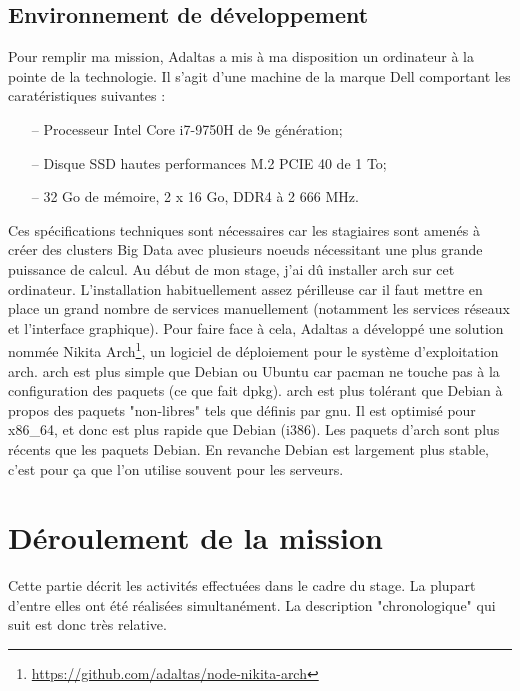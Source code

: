 \documentclass[12pt, french]{report}
\begin{document}
\section{Environnement de développement}

Pour remplir ma mission, Adaltas a mis à ma disposition un ordinateur à la pointe de la technologie. Il s'agit d'une machine de la marque Dell comportant les caratéristiques suivantes :

\begin{itemize}
  \item[--] Processeur Intel Core i7-9750H de 9e génération;
  \item[--] Disque SSD hautes performances M.2 PCIE 40 de 1 To;
  \item[--] 32 Go de mémoire, 2 x 16 Go, DDR4 à 2 666 MHz.\\
\end{itemize}

Ces spécifications techniques sont nécessaires car les stagiaires sont amenés à créer des clusters Big Data avec plusieurs noeuds nécessitant une plus grande puissance de calcul. Au début de mon stage, j’ai dû installer \gls{arch} sur cet ordinateur. L’installation  habituellement assez périlleuse car il faut mettre en place un grand nombre de services manuellement (notamment les services réseaux et l’interface graphique). Pour faire face à cela, Adaltas a développé une solution nommée Nikita Arch\footnote{\href{https://github.com/adaltas/node-nikita-arch}{https://github.com/adaltas/node-nikita-arch}}, un logiciel de déploiement pour le système d'exploitation \gls{arch}. \gls{arch} est plus simple que Debian ou Ubuntu car \gls{pacman} ne touche pas à la configuration des paquets (ce que fait \gls{dpkg}). \gls{arch} est plus tolérant que Debian à propos des paquets "non-libres" tels que définis par \gls{gnu}. Il est optimisé pour x86\_64, et donc est plus rapide que Debian (i386). Les paquets d'\gls{arch} sont plus récents que les paquets Debian. En revanche Debian est largement plus stable, c'est pour ça que l'on utilise souvent pour les serveurs.

\chapter{Déroulement de la mission}

Cette partie décrit les activités effectuées dans le cadre du stage. La plupart d'entre elles ont été réalisées simultanément. La description "chronologique" qui suit est donc très relative.
\end{document}
